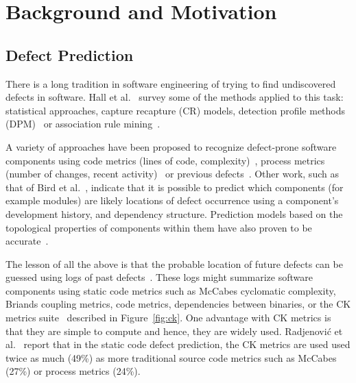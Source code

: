 \documentclass[10pt,conference]{IEEEtran}
\theoremstyle{break}
\theoremstyle{break}
\begin{document}
 


\section{Background and Motivation}

\subsection{Defect Prediction}
\label{sect:review}

There is a long tradition in software engineering of trying to find undiscovered defects in software. 
Hall et al.~\cite{hall2012systematic} survey some of the methods
applied to this task: statistical approaches, capture recapture 
(CR) models, detection profile methods (DPM)~\cite{song2011general} or
association rule mining~\cite{song2006software}. 

A variety of approaches have been proposed to recognize
 defect-prone  software components using code metrics (lines of code, complexity)~\cite{d2010extensive,menzies2007data, nagappan2006mining,shepperd2014researcher,Menzies2010}, process metrics (number of changes, recent activity)~\cite{hassan2009predicting} or previous defects~\cite{kim2007predicting}.
Other work, such as that of 
Bird et al.~\cite{bird2009putting}, indicate that it is possible to predict which components (for example modules) are likely locations of
defect occurrence using a component's development history,
and dependency structure. 
Prediction models based on the topological properties
of components within them have also  proven to be  
accurate~\cite{zimmermann2008predicting}.

The lesson of all the above  is that the probable location
of future defects can be guessed using   logs of past defects~\cite{hall2012systematic, catal2009systematic}. These logs might
summarize software components using
static code metrics such as 
McCabes  cyclomatic  complexity, Briands coupling metrics, code metrics,  
dependencies between  binaries, or
the  CK  metrics  suite~\cite{chidamber1994metrics} described in  Figure~\ref{fig:ck}. 
One advantage with CK metrics is that they are  simple  to  compute and hence,
they are widely used. Radjenovi{\'c} et al.~\cite{radjenovic2013software} report that in
the static code defect prediction, the CK metrics are used
used  twice as much (49\%) 
as more traditional source code metrics such as McCabes (27\%) or process metrics (24\%).
\end{document}
